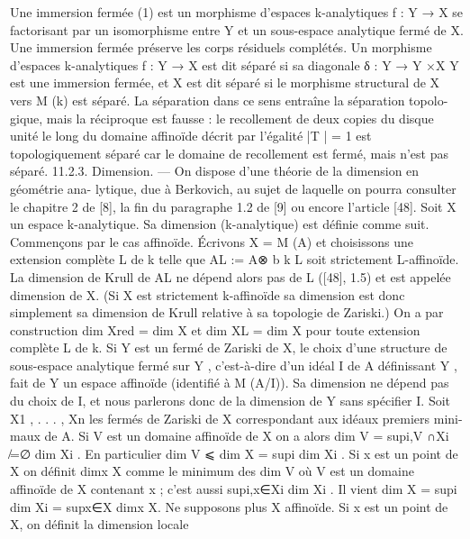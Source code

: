 \documentclass[
  10pt,
]{article}
\newenvironment{Shaded}{}{}
\newcommand{\NormalTok}[1]{#1}
\begin{document}
\begin{Shaded}
\begin{Highlighting}[]
\NormalTok{   Une immersion fermée (1) est un morphisme d’espaces k{-}analytiques f : Y → X se}
\NormalTok{factorisant par un isomorphisme entre Y et un sous{-}espace analytique fermé de X. Une}
\NormalTok{immersion fermée préserve les corps résiduels complétés.}
\NormalTok{   Un morphisme d’espaces k{-}analytiques f : Y → X est dit séparé si sa diagonale}
\NormalTok{δ : Y → Y ×X Y est une immersion fermée, et X est dit séparé si le morphisme structural}
\NormalTok{de X vers M (k) est séparé. La séparation dans ce sens entraîne la séparation topolo{-}}
\NormalTok{gique, mais la réciproque est fausse : le recollement de deux copies du disque unité le}
\NormalTok{long du domaine affinoïde décrit par l’égalité |T | = 1 est topologiquement séparé car le}
\NormalTok{domaine de recollement est fermé, mais n’est pas séparé.}
\NormalTok{11.2.3. Dimension. — On dispose d’une théorie de la dimension en géométrie ana{-}}
\NormalTok{lytique, due à Berkovich, au sujet de laquelle on pourra consulter le chapitre 2 de [8], la}
\NormalTok{fin du paragraphe 1.2 de [9] ou encore l’article [48].}
\NormalTok{   Soit X un espace k{-}analytique. Sa dimension (k{-}analytique) est définie comme suit.}
\NormalTok{Commençons par le cas affinoïde. Écrivons X = M (A) et choisissons une extension}
\NormalTok{complète L de k telle que AL := A⊗        b k L soit strictement L{-}affinoïde. La dimension de}
\NormalTok{Krull de AL ne dépend alors pas de L ([48], 1.5) et est appelée dimension de X. (Si X est}
\NormalTok{strictement k{-}affinoïde sa dimension est donc simplement sa dimension de Krull relative}
\NormalTok{à sa topologie de Zariski.) On a par construction dim Xred = dim X et dim XL = dim X}
\NormalTok{pour toute extension complète L de k.}
\NormalTok{   Si Y est un fermé de Zariski de X, le choix d’une structure de sous{-}espace analytique}
\NormalTok{fermé sur Y , c’est{-}à{-}dire d’un idéal I de A définissant Y , fait de Y un espace affinoïde}
\NormalTok{(identifié à M (A/I)). Sa dimension ne dépend pas du choix de I, et nous parlerons donc}
\NormalTok{de la dimension de Y sans spécifier I.}
\NormalTok{   Soit X1 , . . . , Xn les fermés de Zariski de X correspondant aux idéaux premiers mini{-}}
\NormalTok{maux de A. Si V est un domaine affinoïde de X on a alors dim V = supi,V ∩Xi ̸=∅ dim Xi .}
\NormalTok{En particulier dim V ⩽ dim X = supi dim Xi . Si x est un point de X on définit dimx X}
\NormalTok{comme le minimum des dim V où V est un domaine affinoïde de X contenant x ; c’est}
\NormalTok{aussi supi,x∈Xi dim Xi . Il vient dim X = supi dim Xi = supx∈X dimx X.}
\NormalTok{   Ne supposons plus X affinoïde. Si x est un point de X, on définit la dimension locale}

\end{Highlighting}
\end{Shaded}
\end{document}
